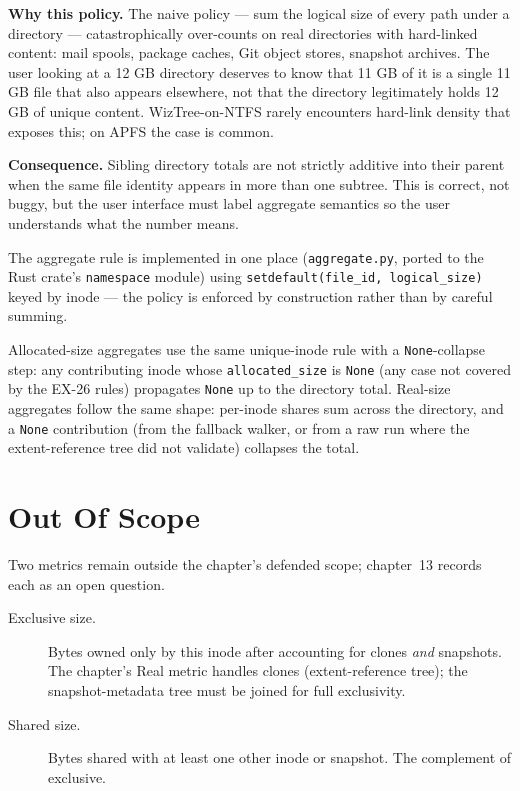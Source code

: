 \textbf{Why this policy.} The naive policy --- sum the logical size of
every path under a directory --- catastrophically over-counts on real
directories with hard-linked content: mail spools, package caches,
Git object stores, snapshot archives. The user looking at a 12 GB
directory deserves to know that 11 GB of it is a single 11 GB file
that also appears elsewhere, not that the directory legitimately
holds 12 GB of unique content. WizTree-on-NTFS rarely encounters
hard-link density that exposes this; on APFS the case is common.

\textbf{Consequence.} Sibling directory totals are not strictly
additive into their parent when the same file identity appears in
more than one subtree. This is correct, not buggy, but the user
interface must label aggregate semantics so the user understands
what the number means.

The aggregate rule is implemented in one place
(\texttt{aggregate.py}, ported to the Rust crate's
\texttt{namespace} module) using
\texttt{setdefault(file\_id, logical\_size)} keyed by inode --- the
policy is enforced by construction rather than by careful summing.

Allocated-size aggregates use the same unique-inode rule with a
\texttt{None}-collapse step: any contributing inode whose
\texttt{allocated\_size} is \texttt{None} (any case not covered by
the EX-26 rules) propagates \texttt{None} up to the directory
total. Real-size aggregates follow the same shape: per-inode
shares sum across the directory, and a \texttt{None} contribution
(from the fallback walker, or from a raw run where the
extent-reference tree did not validate) collapses the total.

\section{Out Of Scope}

Two metrics remain outside the chapter's defended scope; chapter~13
records each as an open question.

\begin{description}
  \item[Exclusive size.] Bytes owned only by this inode after
    accounting for clones \emph{and} snapshots. The chapter's Real
    metric handles clones (extent-reference tree); the
    snapshot-metadata tree must be joined for full exclusivity.
  \item[Shared size.] Bytes shared with at least one other inode
    or snapshot. The complement of exclusive.
\end{description}
